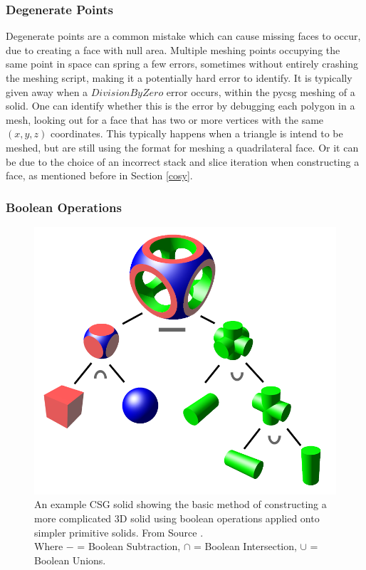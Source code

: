 \documentclass[12pt,a4paper]{article}
\begin{document}
\subsubsection{Degenerate Points}
Degenerate points are a common mistake which can cause missing faces to occur, due to creating a face with null area. Multiple meshing points occupying the same point in space can spring a few errors, sometimes without entirely crashing the meshing script, making it a potentially hard error to identify. It is typically given away when a $DivisionByZero$ error occurs, within the pycsg meshing of a solid. One can identify whether this is the error by debugging each polygon in a mesh, looking out for a face that has two or more vertices with the same $(x,y,z)$ coordinates. This typically happens when a triangle is intend to be meshed, but are still using the format for meshing a quadrilateral face. Or it can be due to the choice of an incorrect stack and slice iteration when constructing a face, as mentioned before in Section \ref{cosy}.

\subsubsection{Boolean Operations}
\label{bool}

\begin{figure}[h!]
\centering
\includegraphics[scale=0.25]{Images//Booleans//Boolean.png}
\caption[width=\columnwidth]{An example CSG solid showing the basic method of constructing a more complicated 3D solid using boolean operations applied onto simpler primitive solids. From Source \cite{wiki}.\\
Where $-$ = Boolean Subtraction, $\cap$ = Boolean Intersection, $\cup$ = Boolean Unions.}
\label{booly}
\end{figure}
\end{document}
